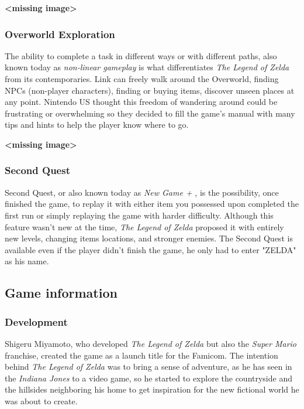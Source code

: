 \documentclass[a4paper,10pt]{book}
\begin{document}
 
 \textbf{<missing image>}
 
 
 \subsubsection{Overworld Exploration }
 
              The ability to complete a task in different ways or with different paths, also 
              known today as  \textit{non-linear gameplay } is what differentiates  \textit{The Legend
              of Zelda } from its contemporaries. Link can freely walk around the Overworld, 
              finding NPCs (non-player characters), finding or buying items, discover unseen
              places at any point. Nintendo US thought this freedom of wandering around could be
              frustrating or overwhelming so they decided to fill the game's manual with many
              tips and hints to help the player know where to go.
               
 
 
 \textbf{<missing image>}
 
 \subsubsection{Second Quest }
 
          Second Quest, or also known today as  \textit{New Game + }, is the possibility, once
          finished the game, to replay it with either item you possessed upon completed
          the first run or simply replaying the game with harder difficulty. Although
          this feature wasn't new at the time,  \textit{The Legend of Zelda }
          proposed it with entirely new levels, changing items locations, and
          stronger enemies.  The Second Quest is available even if the player
          didn't finish the game, he only had to enter "ZELDA" as his
          name.
           
 \subsection{Game information }
 \subsubsection{Development }
 
          Shigeru Miyamoto, who developed  \textit{The Legend of Zelda } but also
          the  \textit{Super Mario } franchise, created the game as a launch title
          for the Famicom. The intention behind  \textit{The Legend of Zelda } was
          to bring a sense of adventure, as he has seen in the  \textit{Indiana Jones }
          to a video game, so he started to explore the countryside and the
          hillsides neighboring his home to get inspiration for the new
          fictional world he was about to create.
           
\end{document}
